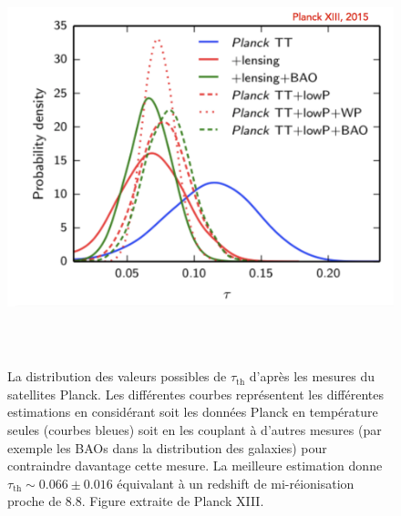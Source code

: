 \begin{figure}[htbp]
	\centering
		\includegraphics[height=12cm]{figs/tau.png}
		\caption[L'opacité Thomson du CMB]{La distribution des valeurs possibles de $\tau_\mathrm{th}$ d'après les mesures du satellites Planck. Les différentes courbes représentent les différentes estimations en considérant soit les données Planck en température seules (courbes bleues) soit en les couplant à d'autres mesures (par exemple les BAOs dans la distribution des galaxies) pour contraindre davantage cette mesure. La meilleure estimation donne $\tau_\mathrm{th}\sim 0.066 \pm 0.016$ équivalant à un redshift de mi-réionisation proche de 8.8. Figure extraite de Planck XIII.}
	\label{f:tau}
\end{figure}

